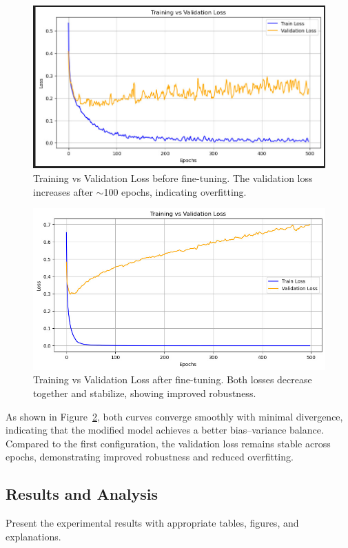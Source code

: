 \documentclass[12pt]{article}
\begin{document}
\begin{figure}[H]
\centering
\includegraphics[width=0.8\linewidth]{loss_curve_before1.jpeg}
\caption{Training vs Validation Loss before fine-tuning. The validation loss increases after $\sim$100 epochs, indicating overfitting.}
\label{fig:loss_before}
\end{figure}

\begin{figure}[H]
\centering
\includegraphics[width=0.8\linewidth]{loss_curve_before2.jpeg}
\caption{Training vs Validation Loss after fine-tuning. Both losses decrease together and stabilize, showing improved robustness.}
\label{fig:loss_after}
\end{figure}

As shown in Figure~\ref{fig:loss_after}, both curves converge smoothly with minimal divergence, 
indicating that the modified model achieves a better bias–variance balance. 
Compared to the first configuration, the validation loss remains stable across epochs, 
demonstrating improved robustness and reduced overfitting.

\subsection{Results and Analysis}
Present the experimental results with appropriate tables, figures, and explanations.
\end{document}
